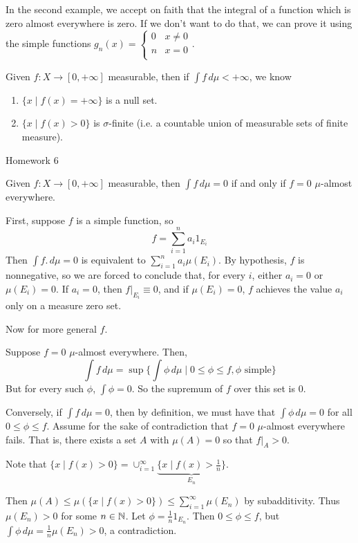 \documentclass[x11names,reqno,14pt]{extarticle}
\newcommand*{\oo}{\infty}
\newcommand{\seq}[1]{_{#1 = 1}^\oo}
\begin{document}
In the second example, we accept on faith that the integral of a function which is zero almost everywhere is zero. If we don't want to do that, we can prove it using the simple functions $g_n(x) = \begin{cases} 0 & x \neq 0 \\ n & x = 0 \\ \end{cases}$. 

\prop

Given $f:X\to[0, +\oo]$ measurable, then if $\int f\,d\mu < +\oo$, we know 
\begin{enumerate}[label=(\roman*)]
\item $\{x \mid f(x) = +\oo\}$ is a null set.
\item $\{x \mid f(x) > 0\}$ is $\sigma$-finite (i.e. a countable union of measurable sets of finite measure). 
\end{enumerate}

\proof

Homework 6

\prop

Given $f:X\to[0, +\oo]$ measurable, then $\int f\,d\mu = 0$ if and only if $f = 0$ $\mu$-almost everywhere. 

\proof

First, suppose $f$ is a simple function, so
\[
f = \sum_{i=1}^na_i1_{E_i}
\]
Then $\int f.\,d\mu = 0$ is equivalent to $\sum_{i=1}^na_i\mu(E_i)$. By hypothesis, $f$ is nonnegative, so we are forced to conclude that, for every $i$, either $a_i = 0$ or $\mu(E_i) = 0$. If $a_i = 0$, then $f|_{E_i} \equiv 0$, and if $\mu(E_i) = 0$, $f$ achieves the value $a_i$ only on a measure zero set. 

Now for more general $f$. 

Suppose $f = 0$ $\mu$-almost everywhere. Then, 
\[
\int f\,d\mu = \sup\{\int\phi\,d\mu \mid 0 \leq \phi \leq f, \phi \text{ simple}\}
\]
But for every such $\phi$, $\int \phi = 0$. So the supremum of $f$ over this set is $0$. 

Conversely, if $\int f\,d\mu = 0$, then by definition, we must have that $\int \phi \,d\mu = 0$ for all $0\leq \phi \leq f$. Assume for the sake of contradiction that $f = 0$ $\mu$-almost everywhere fails. That is, there exists a set $A$ with $\mu(A) = 0$ so that $f|_{A} > 0$.

Note that $\{x \mid f(x) > 0 \} = \cup\seq{i}\underbrace{\{x \mid f(x) > \frac{1}{n}\}}_{E_n}$. 

Then $\mu(A) \leq \mu(\{x \mid f(x) > 0 \}) \leq \sum\seq{i}\mu(E_n)$ by subadditivity. Thus $\mu(E_n) > 0$ for some $n \in\mathbb{N}$. Let $\phi = \frac{1}{n}1_{E_n}$. Then $0 \leq \phi \leq f$, but $\int\phi\,d\mu = \frac{1}{n}\mu(E_n) > 0$, a contradiction. 
\end{document}
